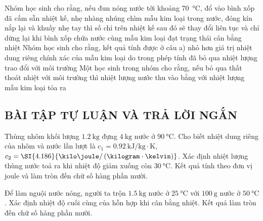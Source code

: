 \begin{ex}
	{\True Nhóm học sinh cho rằng, nếu đun nóng nước tới khoảng \SI{70}{\celsius}, đổ vào bình xốp đã cắm sẵn nhiệt kế, nhẹ nhàng nhúng chìm mẫu kim loại trong nước, đóng kín nắp lại và khuấy nhẹ tay thì số chỉ trên nhiệt kế sau đó sẽ thay đổi liên tục và chỉ dừng lại khi bình xốp chứa nước cùng mẫu kim loại đạt trạng thái cân bằng nhiệt}
	{Nhóm học sinh cho rằng, kết quả tính được ở câu a) nhỏ hơn giá trị nhiệt dung riêng chính xác của mẫu kim loại do trong phép tính đã bỏ qua nhiệt lượng trao đổi với môi trường}
	{Một học sinh trong nhóm cho rằng, nếu bỏ qua thất thoát nhiệt với môi trường thì nhiệt lượng nước thu vào bằng với nhiệt lượng mẫu kim loại tỏa ra}
	\loigiai{}
\end{ex}
\subsection{BÀI TẬP TỰ LUẬN VÀ TRẢ LỜI NGẮN}
\setcounter{ex}{0}
\begin{ex}
Thùng nhôm khối lượng $\SI{1.2}{\kilogram}$ đựng $\SI{4}{\kilogram}$ nước ở $\SI{90}{\celsius}$. Cho biết nhiệt dung riêng của nhôm và nước lần lượt là $c_1=\SI{0.92}{\kilo\joule/\kilogram\cdot\kelvin}$, $c_2=\SI{4.186}{\kilo\joule/\left(\kilogram\cdot\kelvin\right)}$. Xác định nhiệt lượng thùng nước toả ra khi nhiệt độ giảm xuống còn $\SI{30}{\celsius}$. Kết quả tính theo đơn vị joule và làm tròn đến chữ số hàng phần mười.
	
\end{ex}
\begin{ex}
	Để làm nguội nước nóng, người ta trộn $\SI{1.5}{\kilogram}$ nước ở $\SI{25}{\celsius}$ với $\SI{100}{\gram}$ nước ở $\SI{50}{\celsius}$. Xác định nhiệt độ cuối cùng của hỗn hợp khi cân bằng nhiệt. Kết quả làm tròn đến chữ số hàng phần mười.
	
\end{ex}
